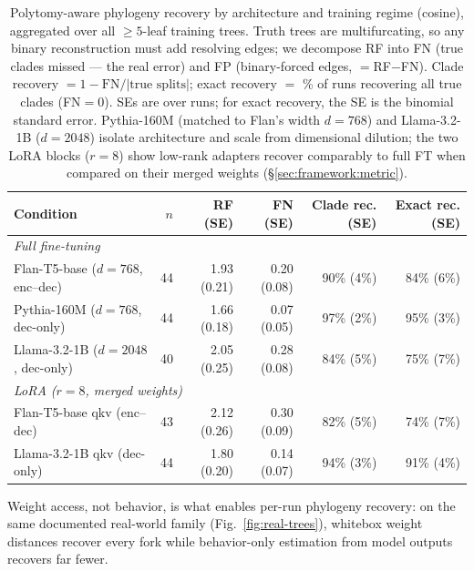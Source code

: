 \documentclass{article}
\theoremstyle{definition}
\theoremstyle{plain}
\begin{document}
\begin{table}[t]
\caption{Polytomy-aware phylogeny recovery by architecture and training regime (cosine), aggregated over
  all $\geq 5$-leaf training trees. Truth trees are multifurcating, so any binary reconstruction must
  add resolving edges; we decompose RF into FN (true clades missed --- the real error) and FP
  (binary-forced edges, $=$RF$-$FN). Clade recovery $=1-\mathrm{FN}/|\text{true splits}|$; exact recovery
  $=$ \% of runs recovering all true clades (FN$=0$). SEs are over runs; for exact recovery, the SE is
  the binomial standard error. Pythia-160M (matched to Flan's
  width $d=768$) and Llama-3.2-1B ($d=2048$) isolate architecture and scale from dimensional dilution;
  the two LoRA blocks ($r=8$) show low-rank adapters recover comparably to full FT when compared on
  their merged weights (\S\ref{sec:framework:metric}).}
\label{tab:rf_by_leaves}
\begin{center}
\small
\setlength{\tabcolsep}{4pt}
\begin{tabular}{lrrrrr}
\toprule
Condition & $n$ & RF (SE) & FN (SE) & Clade rec. (SE) & Exact rec. (SE) \\
\midrule
\multicolumn{6}{l}{\textit{Full fine-tuning}} \\
Flan-T5-base ($d{=}768$, enc--dec)   & 44 & 1.93 (0.21) & 0.20 (0.08) & 90\% (4\%) & 84\% (6\%) \\
Pythia-160M ($d{=}768$, dec-only)    & 44 & 1.66 (0.18) & 0.07 (0.05) & 97\% (2\%) & 95\% (3\%) \\
Llama-3.2-1B ($d{=}2048$, dec-only)  & 40 & 2.05 (0.25) & 0.28 (0.08) & 84\% (5\%) & 75\% (7\%) \\
\midrule
\multicolumn{6}{l}{\textit{LoRA ($r{=}8$, merged weights)}} \\
Flan-T5-base qkv (enc--dec)          & 43 & 2.12 (0.26) & 0.30 (0.09) & 82\% (5\%) & 74\% (7\%) \\
Llama-3.2-1B qkv (dec-only)          & 44 & 1.80 (0.20) & 0.14 (0.07) & 94\% (3\%) & 91\% (4\%) \\
\bottomrule
\end{tabular}
\end{center}
\end{table}

Weight access, not behavior, is what enables per-run phylogeny recovery: on the same documented
real-world family (Fig.~\ref{fig:real-trees}), whitebox weight distances recover every fork while
behavior-only estimation from model outputs recovers far fewer.
\end{document}
